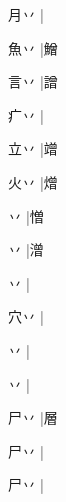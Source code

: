 \begin{multicols}{2}
{{\cjk{}月丷{\cnjzr{}}}\mktsJzrVerticalBar{}{\cjk{}{\cnsym{}　}{\cnsym{}　}{\cnsym{}　}}|{}\par
{\cjk{}魚丷{\cnjzr{}}}\mktsJzrVerticalBar{}{\cjk{}{\cnsym{}　}{\cnsym{}　}{\cnsym{}　}}|{\cjk{}鱛}\par
{\cjk{}言丷{\cnjzr{}}}\mktsJzrVerticalBar{}{\cjk{}{\cnsym{}　}{\cnsym{}　}{\cnsym{}　}}|{\cjk{}譄}\par
{\cjk{}疒丷{\cnjzr{}}}\mktsJzrVerticalBar{}{\cjk{}{\cnsym{}　}{\cnsym{}　}{\cnsym{}　}}|{}\par
{\cjk{}立丷{\cnjzr{}}}\mktsJzrVerticalBar{}{\cjk{}{\cnsym{}　}{\cnsym{}　}{\cnsym{}　}}|{\cjk{}竲}\par
{\cjk{}火丷{\cnjzr{}}}\mktsJzrVerticalBar{}{\cjk{}{\cnsym{}　}{\cnsym{}　}{\cnsym{}　}}|{\cjk{}熷}\par
{丷{\cnjzr{}}}\mktsJzrVerticalBar{}{\cjk{}{\cnsym{}　}{\cnsym{}　}{\cnsym{}　}}|{\cjk{}憎}\par
{丷{\cnjzr{}}}\mktsJzrVerticalBar{}{\cjk{}{\cnsym{}　}{\cnsym{}　}{\cnsym{}　}}|{\cjk{}潧}\par
{丷{\cnjzr{}}}\mktsJzrVerticalBar{}{\cjk{}{\cnsym{}　}{\cnsym{}　}{\cnsym{}　}}|{}\par
{\cjk{}穴丷{\cnjzr{}}}\mktsJzrVerticalBar{}{\cjk{}{\cnsym{}　}{\cnsym{}　}{\cnsym{}　}}|{}\par
{丷{\cnjzr{}}}\mktsJzrVerticalBar{}{\cjk{}{\cnsym{}　}{\cnsym{}　}{\cnsym{}　}}|{}\par
{丷{\cnjzr{}}}\mktsJzrVerticalBar{}{\cjk{}{\cnsym{}　}{\cnsym{}　}{\cnsym{}　}}|{}\par
{\cjk{}尸丷{\cnjzr{}}}\mktsJzrVerticalBar{}{\cjk{}{\cnsym{}　}{\cnsym{}　}{\cnsym{}　}}|{\cjk{}層}\par
{\cjk{}尸丷{\cnjzr{}}}|{}\par
{\cjk{}尸丷{\cnjzr{}}}|{}\par
}
\end{multicols}
